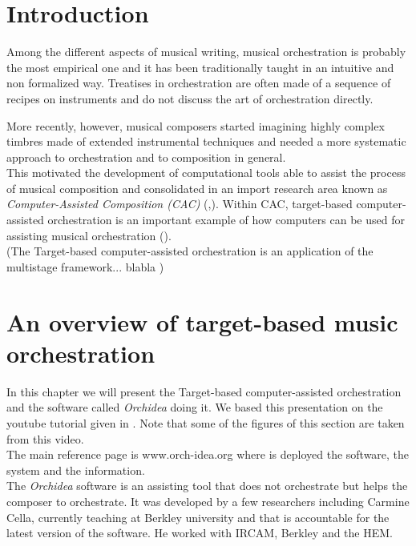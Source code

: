 \documentclass[a4paper]{book}
\begin{document}
\section{Introduction}\label{sec:introduction}
Among the different aspects of musical writing, musical orchestration is probably the most empirical one and it has been traditionally taught in an intuitive and non formalized way. Treatises in orchestration are often made of a sequence of recipes on instruments and do not discuss the art of orchestration directly.

More recently, however, musical composers started imagining highly complex timbres made of extended instrumental techniques and needed a more systematic approach to orchestration and to composition in general. \\

This motivated the development of computational tools able to assist the process of musical composition and consolidated in an import research area known as \textit{Computer-Assisted Composition (CAC)} (\cite{fernandez2013ai},\cite{ariza2005navigating}). Within CAC, target-based computer-assisted orchestration is an important example of how computers can be used for assisting musical orchestration (\cite{maresz2013computer}).\\

(The Target-based computer-assisted orchestration is an application of the multistage framework... blabla )

\section{An overview of target-based music orchestration}\label{otargorch}

In this chapter we will present the Target-based computer-assisted orchestration and the software called \textit{Orchidea} doing it. We based this presentation on the youtube tutorial given in \cite{youtubecella}. Note that some of the figures of this section are taken from this video.\\


The main reference page is www.orch-idea.org where is deployed the software, the system and the information.\\
The \textit{Orchidea} software is an assisting tool that does not orchestrate but helps the composer to orchestrate. It was developed by a few researchers including Carmine Cella, currently teaching at Berkley university and that is accountable for the latest version of the software. He worked with IRCAM, Berkley and the HEM.  \\
\end{document}
